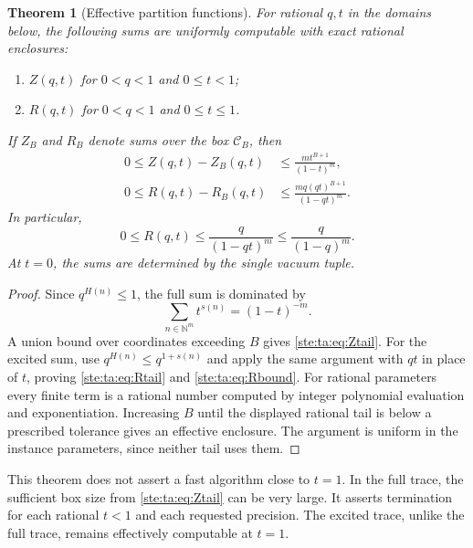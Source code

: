 \documentclass[11pt,letterpaper]{article}
\newtheorem{theorem}{Theorem}[section]
\theoremstyle{definition}
\theoremstyle{remark}
\newcommand{\N}{\mathbb N}
\newcommand{\cB}{\mathcal C_B}
\begin{document}
\begin{theorem}[Effective partition functions]\label{ste:ta:thm:partition}
For rational $q,t$ in the domains below, the following sums are uniformly computable with exact rational enclosures:
\begin{enumerate}[label=(\roman*),itemsep=1pt]
\item $Z(q,t)$ for $0<q<1$ and $0\le t<1$;
\item $R(q,t)$ for $0<q<1$ and $0\le t\le1$.
\end{enumerate}
If $Z_B$ and $R_B$ denote sums over the box $\cB$, then
\begin{align}
0\le Z(q,t)-Z_B(q,t)&\le
\frac{m t^{B+1}}{(1-t)^m},\label{ste:ta:eq:Ztail}\\
0\le R(q,t)-R_B(q,t)&\le
\frac{m q(qt)^{B+1}}{(1-qt)^m}.\label{ste:ta:eq:Rtail}
\end{align}
In particular,
\begin{equation}\label{ste:ta:eq:Rbound}
0\le R(q,t)\le\frac{q}{(1-qt)^m}\le\frac{q}{(1-q)^m}.
\end{equation}
At $t=0$, the sums are determined by the single vacuum tuple.
\end{theorem}
\begin{proof}
Since $q^{H(n)}\le1$, the full sum is dominated by
\[
\sum_{n\in\N^m}t^{s(n)}=(1-t)^{-m}.
\]
A union bound over coordinates exceeding $B$ gives \eqref{ste:ta:eq:Ztail}. For the excited sum, use $q^{H(n)}\le q^{1+s(n)}$ and apply the same argument with $qt$ in place of $t$, proving \eqref{ste:ta:eq:Rtail} and \eqref{ste:ta:eq:Rbound}. For rational parameters every finite term is a rational number computed by integer polynomial evaluation and exponentiation. Increasing $B$ until the displayed rational tail is below a prescribed tolerance gives an effective enclosure. The argument is uniform in the instance parameters, since neither tail uses them.
\end{proof}

This theorem does not assert a fast algorithm close to $t=1$. In the full trace, the sufficient box size from \eqref{ste:ta:eq:Ztail} can be very large. It asserts termination for each rational $t<1$ and each requested precision. The excited trace, unlike the full trace, remains effectively computable at $t=1$.
\end{document}
